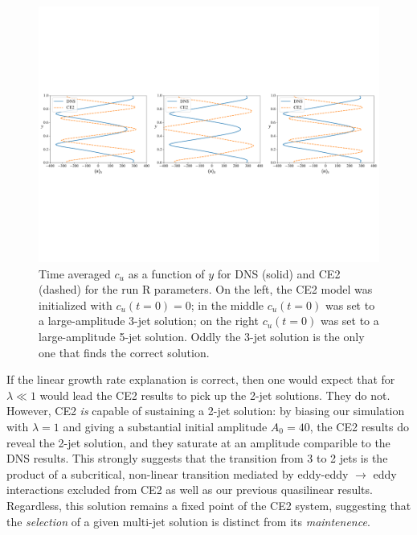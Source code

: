 \documentclass{jfm}
\newcommand{\cu}{c_u}
\begin{document}
\begin{figure}
  \centering
  \includegraphics[width=\textwidth]{../../figs/umean_dns_ce2_runRST.pdf}
  \caption{Time averaged $\cu$ as a function of $y$ for DNS (solid) and CE2 (dashed) for the run R parameters. On the left, the CE2 model was initialized with $\cu(t=0) = 0$; in the middle $\cu(t=0)$ was set to a large-amplitude 3-jet solution; on the right $\cu(t=0)$ was set to a large-amplitude 5-jet solution. Oddly the 3-jet solution is the only one that finds the correct solution.}
  \label{fig:cu_vs_y_runRST}
\end{figure}

If the linear growth rate explanation is correct, then one would expect that for $\lambda \ll 1$ would lead the CE2 results to pick up the 2-jet solutions.
They do not.
However, CE2 \emph{is} capable of sustaining a 2-jet solution:
by biasing our simulation with $\lambda = 1$ and giving a substantial initial amplitude $A_0 = 40$, the CE2 results do reveal the 2-jet solution, and they saturate at an amplitude comparible to the DNS results.
This strongly suggests that the transition from 3 to 2 jets is the product of a subcritical, non-linear transition mediated by eddy-eddy $\to$ eddy interactions excluded from CE2 as well as our previous quasilinear results.
Regardless, this solution remains a fixed point of the CE2 system, suggesting that the \emph{selection} of a given multi-jet solution is distinct from its \emph{maintenence}.



\end{document}
